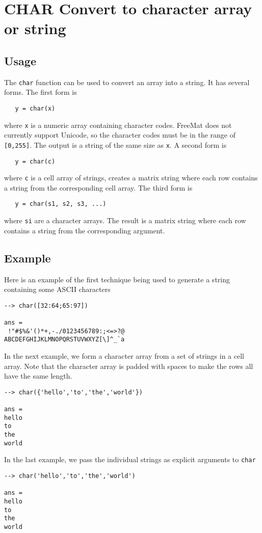 \section{CHAR Convert to character array or string}

\subsection{Usage}

The \verb|char| function can be used to convert an array
into a string.  It has several forms.  The first form
is
\begin{verbatim}
   y = char(x)
\end{verbatim}
where \verb|x| is a numeric array containing character codes.
FreeMat does not currently support Unicode, so the
character codes must be in the range of \verb|[0,255]|.  The
output is a string of the same size as \verb|x|.  A second
form is
\begin{verbatim}
   y = char(c)
\end{verbatim}
where \verb|c| is a cell array of strings, creates a matrix string
where each row contains a string from the corresponding cell array.
The third form is
\begin{verbatim}
   y = char(s1, s2, s3, ...)
\end{verbatim}
where \verb|si| are a character arrays.  The result is a matrix string
where each row contains a string from the corresponding argument.
\subsection{Example}

Here is an example of the first technique being used to generate
a string containing some ASCII characters
\begin{verbatim}
--> char([32:64;65:97])

ans = 
 !"#$%&'()*+,-./0123456789:;<=>?@
ABCDEFGHIJKLMNOPQRSTUVWXYZ[\]^_`a
\end{verbatim}
In the next example, we form a character array from a set of
strings in a cell array.  Note that the character array is padded
with spaces to make the rows all have the same length.
\begin{verbatim}
--> char({'hello','to','the','world'})

ans = 
hello
to   
the  
world
\end{verbatim}
In the last example, we pass the individual strings as explicit
arguments to \verb|char|
\begin{verbatim}
--> char('hello','to','the','world')

ans = 
hello
to   
the  
world
\end{verbatim}

